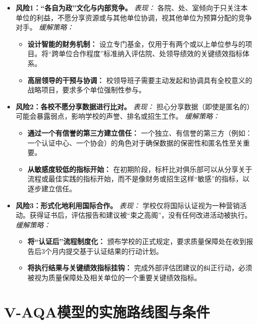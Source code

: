 \begin{itemize}
    \item \textbf{风险1：“各自为政”文化与内部竞争。}
    \textit{表现：} 各院、处、室倾向于只关注本单位的利益，不愿分享资源或与其他单位协调，视其他单位为预算分配的竞争对手。
    \textit{缓解策略：}
    \begin{itemize}
        \item \textbf{设计智能的财务机制：} 设立专门基金，仅用于有两个或以上单位参与的项目。将“跨单位合作程度”标准纳入评估院、处领导绩效的关键绩效指标体系。
        \item \textbf{高层领导的干预与协调：} 校领导班子需要主动发起和协调具有全校意义的战略项目，要求多个单位强制性参与。
    \end{itemize}

    \item \textbf{风险2：各校不愿分享数据进行比对。}
    \textit{表现：} 担心分享数据（即使是匿名的）可能会暴露弱点，影响学校的声誉、排名或招生工作。
    \textit{缓解策略：}
    \begin{itemize}
        \item \textbf{通过一个有信誉的第三方建立信任：} 一个独立、有信誉的第三方（例如：一个认证中心、一个协会）的角色对于确保数据的保密性和匿名性至关重要。
        \item \textbf{从敏感度较低的指标开始：} 在初期阶段，标杆比对俱乐部可以从分享关于流程或最佳实践的指标开始，而不是像财务或招生这样“敏感”的指标，以逐步建立信任。
    \end{itemize}

    \item \textbf{风险3：形式化地利用国际合作。}
    \textit{表现：} 学校仅将国际认证视为一种营销活动。获得证书后，评估报告和建议被“束之高阁”，没有任何改进活动被执行。
    \textit{缓解策略：}
    \begin{itemize}
        \item \textbf{将“认证后”流程制度化：} 颁布学校的正式规定，要求质量保障处在收到报告后3个月内提交基于认证结果的行动计划。
        \item \textbf{将执行结果与关键绩效指标挂钩：} 完成外部评估团建议的纠正行动，必须被视为质量保障处及相关单位的一个重要关键绩效指标。
    \end{itemize}
\end{itemize}




\section{V-AQA模型的实施路线图与条件}
\label{sec:lo_trinh_trien_khai}

